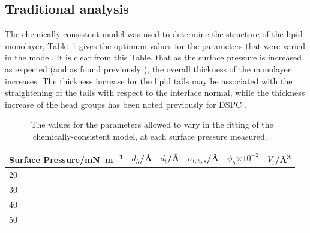 \documentclass[amsmath,amssymb,twocolumn,superscriptaddress]{revtex4-1}
\begin{document}
\subsection{Traditional analysis}
The chemically-consistent model was used to determine the structure of the lipid monolayer, Table~\ref{tab:cc} gives the optimum values for the parameters that were varied in the model.
It is clear from this Table, that as the surface pressure is increased, as expected (and as found previously \cite{mohwald_phospholipid_1990,vaknin_structural_1991}), the overall thickness of the monolayer increases.
The thickness increase for the lipid tails may be associated with the straightening of the tails with respect to the interface normal, while the thickness increase of the head groups has been noted previously for DSPC \cite{hollinshead_effects_2009}.
%
\begin{table}
\small
  \caption{\ The values for the parameters allowed to vary in the fitting of the chemically-consistent model, at each surface pressure measured.}
  \label{tab:cc}
  \begin{tabular*}{\textwidth}{@{\extracolsep{\fill}}llllll}
    \hline
    Surface Pressure/\si{\milli\newton\per\meter} & $d_h$/\si{\angstrom} & $d_t$/\si{\angstrom} & $\sigma_{t,h,s}$/\si{\angstrom} & $\phi_h$$\times10^{-2}$ & $V_t$/\si{\angstrom\cubed} \\
    \hline
    20 &  &  &  &  &  \\
    30 &  &  &  &  &  \\
    40 &  &  &  &  &  \\
    50 &  &  &  &  &  \\
    \hline
  \end{tabular*}
\end{table}
%
\end{document}
